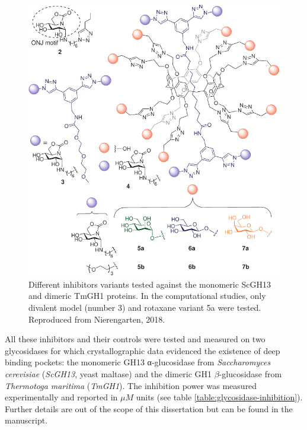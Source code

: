 \begin{figure}[H] %
	\begin{Center}
		\includegraphics[width=\textwidth]{./figures/06/glyco-inhibitors-crop.pdf}
	\end{Center}
	\cprotect\caption[Tested inhibitors against ScGH13 and TmGH1]{Different inhibitors variants tested against the monomeric ScGH13 and dimeric TmGH1 proteins. In the computational studies, only divalent model (number 3) and rotaxane variant 5a were tested. Reproduced from Nierengarten, 2018.\cite{rotaxane}}
	\label{fig:rotaxane-compounds}
\end{figure}



All these inhibitors and their controls were tested and measured on two glycosidases for which crystallographic data evidenced the existence of deep binding pockets: the monomeric GH13 α-glucosidase from \textit{Saccharomyces cerevisiae} (\textit{ScGH13}, yeast maltase) and the dimeric GH1 $\beta$-glucosidase from \textit{Thermotoga maritima} (\textit{TmGH1}). The inhibition power was measured experimentally and reported in $ \mu M $ units (see table \ref{table:glycosidase-inhibition}). Further details are out of the scope of this dissertation but can be found in the manuscript.\cite{rotaxane}


